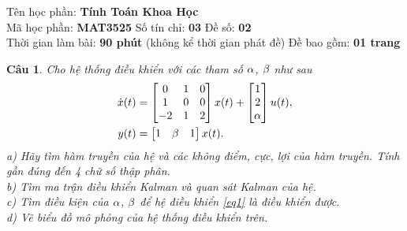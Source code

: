 \documentclass[11pt]{article}
\newtheorem{bt}{Câu}
\begin{document}



\begin{center}
	Tên học phần: {\bf Tính Toán Khoa Học} \\ 
	Mã học phần: \textbf{MAT3525}	\quad Số tín chỉ: \textbf{03} \quad	Đề số: \textbf{02} \\ 
	Thời gian làm bài: \textbf{90 phút} (không kể thời gian phát đề) \quad Đề bao gồm: \textbf{01 trang}
\end{center}


\begin{bt}
	Cho hệ thống điều khiển với các tham số $\alpha$, $\beta$ như sau
	\begin{align}\label{eq1}
		\dot{x}(t) &= \begin{bmatrix} 0 & 1 & 0 \\ 1 & 0 & 0 \\ -2 & 1 & 2 \end{bmatrix} x(t) + \begin{bmatrix} 1 \\ 2 \\ \alpha \end{bmatrix} u(t), \\
		y(t) &= \begin{bmatrix} 1 & \beta & 1 \end{bmatrix} x(t). 
	\end{align}
	a) Hãy tìm hàm truyền của hệ và các không điểm, cực, lợi của hàm truyền. Tính gần đúng đến 4 chữ số thập phân. \\	
	b) Tìm ma trận điều khiển Kalman và quan sát Kalman của hệ. \\
	c) Tìm điều kiện của $\alpha$, $\beta$ để hệ điều khiển \eqref{eq1} là điều khiển được. \\
	d) Vẽ biểu đồ mô phỏng của hệ thống điều khiển trên.
\end{bt}
\end{document}

